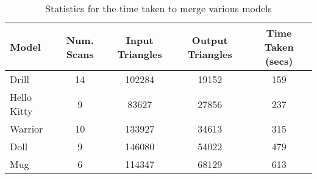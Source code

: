 \begin{table}[t]
\caption{Statistics for the time taken to merge various models}
\label{table:Ch1-Stats}
\centering
\begin{tabular}{lcccc}
	\toprule
	\textbf{Model} & \textbf{Num. Scans} & \textbf{Input Triangles} & \textbf{Output Triangles} & \textbf{Time Taken (secs)} \\
	\midrule
	Drill & 14 & 102284 & 19152 & 159 \\
	Hello Kitty & 9 & 83627 & 27856 & 237 \\
	Warrior & 10 & 133927 & 34613 & 315 \\
	Doll & 9 & 146080 & 54022 & 479 \\
	Mug & 6 & 114347 & 68129 & 613 \\
	\bottomrule
\end{tabular} 
\end{table}